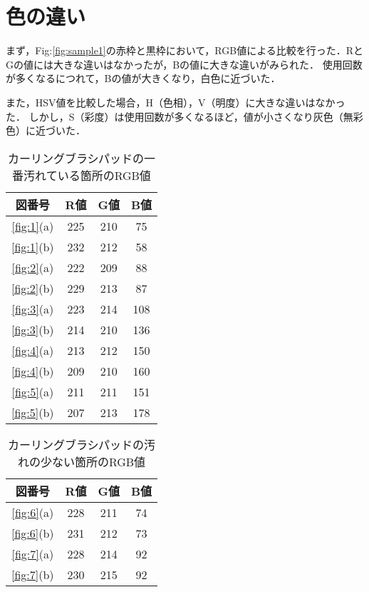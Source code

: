 \documentclass[main]{subfiles}
\begin{document}
\section{色の違い}

まず，Fig:\ref{fig:sample1}の赤枠と黒枠において，RGB値による比較を行った．RとGの値には大きな違いはなかったが，Bの値に大きな違いがみられた．
使用回数が多くなるにつれて，Bの値が大きくなり，白色に近づいた．

また，HSV値を比較した場合，H（色相），V（明度）に大きな違いはなかった．
しかし，S（彩度）は使用回数が多くなるほど，値が小さくなり灰色（無彩色）に近づいた．


\begin{table}[h]
    \caption{カーリングブラシパッドの一番汚れている箇所のRGB値}
    \label{table:RGB1}
    \centering
\begin{tabular}{c|c|c|c}
    図番号 & R値 & G値 & B値 \\ \hline
    \ref{fig:1}(a) & 225 & 210 & 75 \\ \hline
   \ref{fig:1}(b) & 232 & 212 & 58 \\ \hline\hline
   \ref{fig:2}(a) & 222 & 209 & 88 \\ \hline
   \ref{fig:2}(b) & 229 & 213 & 87 \\ \hline
   \ref{fig:3}(a) & 223 & 214 & 108 \\ \hline
   \ref{fig:3}(b) & 214 & 210 & 136 \\ \hline\hline
   \ref{fig:4}(a) & 213 & 212 & 150 \\ \hline
   \ref{fig:4}(b) & 209 & 210 & 160 \\ \hline
   \ref{fig:5}(a) & 211 & 211 & 151 \\ \hline
   \ref{fig:5}(b) & 207 & 213 & 178 \\ 
\end{tabular}    
\end{table}

\begin{table}[h]
    \caption{カーリングブラシパッドの汚れの少ない箇所のRGB値}
    \label{table:RGB2}
    \centering
\begin{tabular}{c|c|c|c}
    図番号 & R値 & G値 & B値 \\ \hline
   \ref{fig:6}(a) & 228 & 211 & 74 \\ \hline
   \ref{fig:6}(b) & 231 & 212 & 73 \\ \hline\hline
   \ref{fig:7}(a) & 228 & 214 & 92 \\ \hline
   \ref{fig:7}(b) & 230 & 215 & 92 \\ 
\end{tabular}    
\end{table}
\end{document}
